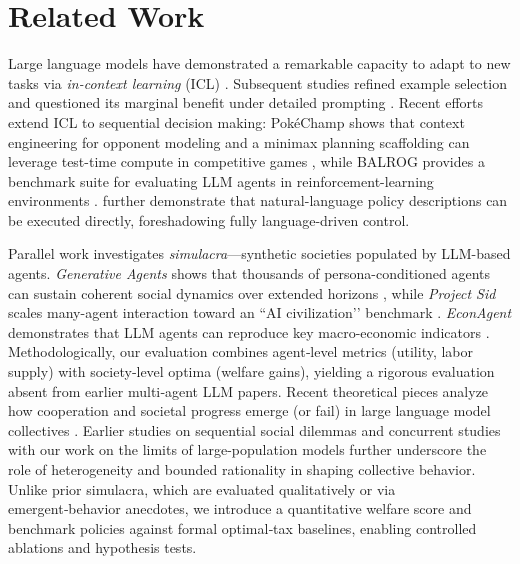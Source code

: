 \section{Related Work} 
Large language models have demonstrated a remarkable capacity to adapt to new tasks via \emph{in-context learning} (ICL) \citep{brown2020language}.  Subsequent studies refined example selection \citep{liu2021makes} and questioned its marginal benefit under detailed prompting \citep{srivastava2024nice}.  Recent efforts extend ICL to sequential decision making: Pok\'eChamp shows that context engineering for opponent modeling and a minimax planning scaffolding can leverage test-time compute in competitive games \citep{karten2024pokchamp}, while BALROG provides a benchmark suite for evaluating LLM agents in reinforcement-learning environments \citep{paglieri2024balrog}.  \citet{feng2024natural} further demonstrate that natural-language policy descriptions can be executed directly, foreshadowing fully language-driven control.

Parallel work investigates \emph{simulacra}—synthetic societies populated by LLM-based agents.  \emph{Generative Agents} shows that thousands of persona-conditioned agents can sustain coherent social dynamics over extended horizons \citep{park2023generative,park2024generative}, while \emph{Project Sid} scales many-agent interaction toward an “AI civilization’’ benchmark \citep{al2024project}.  \emph{EconAgent} demonstrates that LLM agents can reproduce key macro-economic indicators \citep{li2023econagent}.  
Methodologically, our evaluation combines agent‑level metrics (utility, labor supply) with society‑level optima (welfare gains), yielding a rigorous evaluation absent from earlier multi‑agent LLM papers.
Recent theoretical pieces analyze how cooperation and societal progress emerge (or fail) in large language model collectives \citep{willis2025will,leibo2025societal}.  Earlier studies on sequential social dilemmas \citep{leibo2017multi} and concurrent studies with our work on the limits of large-population models \citep{chopra2024limits,yang2024oasis} further underscore the role of heterogeneity and bounded rationality in shaping collective behavior.
Unlike prior simulacra, which are evaluated qualitatively or via emergent‑behavior anecdotes, we introduce a quantitative welfare score and benchmark policies against formal optimal‑tax baselines, enabling controlled ablations and hypothesis tests.


